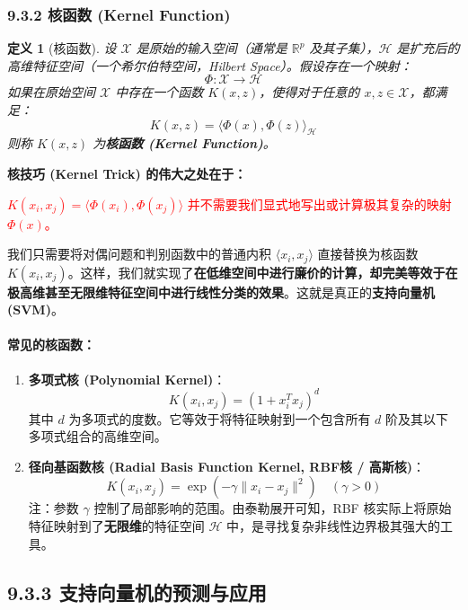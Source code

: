 \documentclass[UTF8]{ctexart}
\newtheorem{definition}[theorem]{定义}
\numberwithin{equation}{section}
\newcommand{\RR}{\mathbb{R}}
\begin{document}
\subsubsection{9.3.2 核函数 (Kernel Function)}

\begin{definition}[核函数]
设 $\mathcal{X}$ 是原始的输入空间（通常是 $\RR^p$ 及其子集），$\mathcal{H}$ 是扩充后的高维特征空间（一个希尔伯特空间，Hilbert Space）。假设存在一个映射：
$$ \Phi: \mathcal{X} \to \mathcal{H} $$
如果在原始空间 $\mathcal{X}$ 中存在一个函数 $K(x, z)$，使得对于任意的 $x, z \in \mathcal{X}$，都满足：
$$ K(x, z) = \langle \Phi(x), \Phi(z) \rangle_{\mathcal{H}} $$
则称 $K(x, z)$ 为\textbf{核函数 (Kernel Function)}。
\end{definition}

\textbf{核技巧 (Kernel Trick) 的伟大之处在于：}
\begin{center}
    \textcolor{red}{$K(x_i, x_j) = \langle \Phi(x_i), \Phi(x_j) \rangle$ 并不需要我们显式地写出或计算极其复杂的映射 $\Phi(x)$。}
\end{center}
我们只需要将对偶问题和判别函数中的普通内积 $\langle x_i, x_j \rangle$ 直接替换为核函数 $K(x_i, x_j)$。这样，我们就实现了\textbf{在低维空间中进行廉价的计算，却完美等效于在极高维甚至无限维特征空间中进行线性分类的效果}。这就是真正的\textbf{支持向量机 (SVM)}。

\paragraph{常见的核函数：}
\begin{enumerate}
    \item \textbf{多项式核 (Polynomial Kernel)}：
    $$ K(x_i, x_j) = (1 + x_i^T x_j)^d $$
    其中 $d$ 为多项式的度数。它等效于将特征映射到一个包含所有 $d$ 阶及其以下多项式组合的高维空间。
    
    \item \textbf{径向基函数核 (Radial Basis Function Kernel, RBF核 / 高斯核)}：
    $$ K(x_i, x_j) = \exp(-\gamma \|x_i - x_j\|^2) \quad (\gamma > 0) $$
    注：参数 $\gamma$ 控制了局部影响的范围。由泰勒展开可知，RBF 核实际上将原始特征映射到了\textbf{无限维}的特征空间 $\mathcal{H}$ 中，是寻找复杂非线性边界极其强大的工具。
\end{enumerate}






\subsection*{9.3.3 支持向量机的预测与应用}
\end{document}
